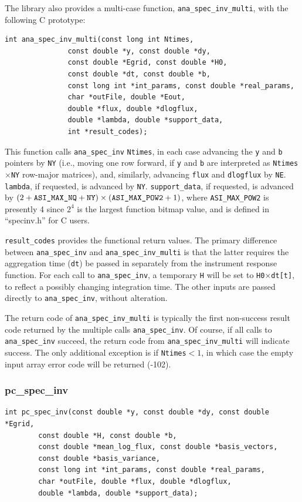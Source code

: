 \documentclass{article}    %
\begin{document}
The library also provides a multi-case function,
\verb|ana_spec_inv_multi|, with the following C prototype:
\begin{verbatim}
int ana_spec_inv_multi(const long int Ntimes,
		       const double *y, const double *dy, 
		       const double *Egrid, const double *H0, 
		       const double *dt, const double *b,
		       const long int *int_params, const double *real_params,
		       char *outFile, double *Eout, 
		       double *flux, double *dlogflux, 
		       double *lambda, double *support_data, 
		       int *result_codes);
\end{verbatim}
This function calls \verb|ana_spec_inv| \verb|Ntimes|, in each case
advancing the \verb|y| and \verb|b| pointers by \verb|NY| (i.e.,
moving one row forward, if \verb|y| and \verb|b| are interpreted as
\verb|Ntimes|$\times$\verb|NY| row-major matrices), and, similarly,
advancing \verb|flux| and \verb|dlogflux| by
\verb|NE|. \verb|lambda|, if requested, is advanced by \verb|NY|.
\verb|support_data|, if requested, is advanced by $(2+\verb|ASI_MAX_NQ|+\verb|NY|)\times(\verb|ASI_MAX_POW2|+1)$,
where \verb|ASI_MAX_POW2| is presently 4 since $2^4$ is the largest
function bitmap value, and is defined in ``specinv.h'' for C users.

\verb|result_codes| provides the functional return values.
The primary difference between \verb|ana_spec_inv| and
\verb|ana_spec_inv_multi| is that the latter requires
the aggregation time (\verb|dt|) be passed in separately from the
instrument response function. For each call to \verb|ana_spec_inv|, a
temporary \verb|H| will be set to \verb|H0|$\times$\verb|dt[t]|, to
reflect a possibly changing integration time. The other inputs
are passed directly to \verb|ana_spec_inv|, without alteration.

The return code of \verb|ana_spec_inv_multi| is typically the first
non-success result code returned by the multiple calls
\verb|ana_spec_inv|. Of course, if all calls to \verb|ana_spec_inv| succeed,
the return code from \verb|ana_spec_inv_multi| will indicate
success. The only additional exception is if \verb|Ntimes|$<1$, in
which case the empty input array error code will be returned (-102).

\subsubsection{pc\_spec\_inv}
\begin{verbatim}
int pc_spec_inv(const double *y, const double *dy, const double *Egrid, 
		const double *H, const double *b,
		const double *mean_log_flux, const double *basis_vectors, 
		const double *basis_variance,
		const long int *int_params, const double *real_params,
		char *outFile, double *flux, double *dlogflux, 
		double *lambda, double *support_data);
\end{verbatim}
\end{document}
